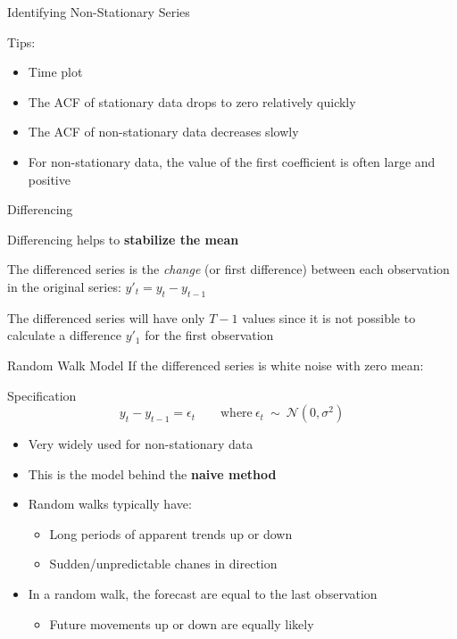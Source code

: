 \documentclass{beamer}
\newenvironment{wideitemize}{\itemize\addtolength{\itemsep}{10pt}}{\enditemize}
\begin{document}
\begin{frame}{Identifying Non-Stationary Series}

  Tips:\\
  
  \begin{itemize}
  \item Time plot
  \item The ACF of stationary data drops to zero relatively quickly
  \item The ACF of non-stationary data decreases slowly
  \item For non-stationary data, the value of the first coefficient is often large and positive
  \end{itemize}

  
\end{frame}




\begin{frame}{Differencing}
  \begin{wideitemize}
  \item Differencing helps to \textbf{stabilize the mean}
  \item The differenced series is the \emph{change} (or first difference) between each observation in the original series: $y'_t = y_t - y_{t-1}$
  \item The differenced series will have only $T-1$ values since it is not possible to calculate a difference $y'_1$ for the first observation
  \end{wideitemize}

\end{frame}


\begin{frame}{Random Walk Model}
  If the differenced series is white noise with zero mean:
  \begin{block}{Specification}
    \begin{equation*}
      y_t - y_{t-1} = \epsilon_t \qquad \text{where} \ \epsilon_t \ \sim \ \mathcal{N}(0, \sigma^2)
    \end{equation*}
  \end{block}

  \begin{itemize}
  \item Very widely used for non-stationary data
  \item This is the model behind the \textbf{naive method}
  \item Random walks typically have:
    \begin{itemize}
    \item Long periods of apparent trends up or down
    \item Sudden/unpredictable chanes in direction
    \end{itemize}
  \item In a random walk, the forecast are equal to the last observation
    \begin{itemize}
    \item Future movements up or down are equally likely
    \end{itemize}
  \end{itemize}   
\end{frame}
\end{document}
